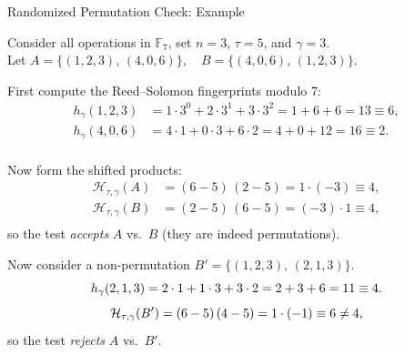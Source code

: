 \documentclass{zkdl-presentation-template}
\begin{document}
    \begin{frame}{Randomized Permutation Check: Example}
        \begin{example}
            \small
            Consider all operations in $\mathbb{F}_7$, set $n=3$, $\tau=5$, and $\gamma=3$.\\
            Let $A = \{(1,2,3),\,(4,0,6)\}, \quad B = \{(4,0,6),\,(1,2,3)\}.$
            \pause

            \vspace{5px}
            First compute the Reed–Solomon fingerprints modulo 7:
            \vspace{-7px}
            \begin{align*}
                h_{\gamma}(1,2,3) &=1\cdot3^0 + 2\cdot3^1 + 3\cdot3^2 =1 + 6 + 6 =13 \equiv 6,\\
                h_{\gamma}(4,0,6) &=4\cdot1 + 0\cdot3 + 6\cdot2 =4 + 0 + 12 =16 \equiv 2. \\[-23pt]
            \end{align*}
            \pause

            Now form the shifted products:
            \vspace{-7px}
            \begin{align*}
                \mathcal{H}_{\tau,\gamma}(A) &=(6-5)\,(2-5) =1\cdot(-3)\equiv4,\\
                \mathcal{H}_{\tau,\gamma}(B) &=(2-5)\,(6-5) =(-3)\cdot1\equiv4,\\[-23pt]
            \end{align*}
            so the test \emph{accepts} $A$ vs.\ $B$ (they are indeed permutations). \\
            \pause

            \vspace{5px}
            Now consider a non-permutation $B' = \{(1,2,3),\,(2,1,3)\}.$
            \vspace{-5px}
            \begin{equation*}
                h_{\gamma}(2,1,3) =2\cdot1 + 1\cdot3 + 3\cdot2 =2 + 3 + 6 =11 \equiv 4.
                \vspace{-10px}
            \end{equation*}
            \begin{equation*}
                \mathcal{H}_{\tau,\gamma}(B') =(6-5)\,(4-5) =1\cdot(-1)\equiv6\neq4,
                \vspace{-5px}
            \end{equation*}
            so the test \emph{rejects} $A$ vs.\ $B'$.
        \end{example}
    \end{frame}
\end{document}
